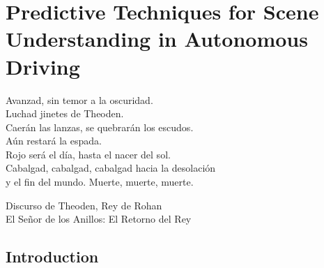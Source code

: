 % 
% 
% 
% 
% 
% 
% 

\chapter{Predictive Techniques for Scene Understanding in Autonomous Driving}
\label{cha:predictive_techniques_in_ad}

\begin{FraseCelebre}
	\begin{Frase}
		Avanzad, sin temor a la oscuridad. \\
		Luchad jinetes de Theoden. \\
		Caerán las lanzas, se quebrarán los escudos. \\
		Aún restará la espada. \\
		Rojo será el día, hasta el nacer del sol. \\
		Cabalgad, cabalgad, cabalgad hacia la desolación \\ 
		y el fin del mundo. Muerte, muerte, muerte.
	\end{Frase}
	\begin{Fuente}
		Discurso de Theoden, Rey de Rohan \\
		El Señor de los Anillos: El Retorno del Rey
	\end{Fuente}
\end{FraseCelebre}

\section{Introduction}
\label{sec:4_introduction}

